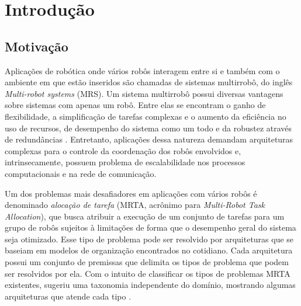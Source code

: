 \chapter[Introdução]{Introdução} \label{cap:introducao}

    \section{Motivação} \label{sec:motivacao}
        Aplicações de robótica onde vários robôs interagem entre si e também com o ambiente em que estão inseridos são chamadas de sistemas multirrobô, do inglês \textit{Multi-robot systems} (MRS). Um sistema multirrobô possui diversas vantagens sobre sistemas com apenas um robô. Entre elas se encontram o ganho de flexibilidade, a simplificação de tarefas complexas e o aumento da eficiência no uso de recursos, de desempenho do sistema como um todo e da robustez através de redundâncias \cite{ref:cao1997cooperative, ref:dudek1996taxonomy, ref:zlot2002multi}. Entretanto, aplicações dessa natureza demandam arquiteturas complexas para o controle da coordenação dos robôs envolvidos e, intrinsecamente, possuem problema de escalabilidade nos processos computacionais e na rede de comunicação. 
        
        Um dos problemas mais desafiadores em aplicações com vários robôs é denominado \textit{alocação de tarefa} (MRTA, acrônimo para \textit{Multi-Robot Task Allocation}), que busca atribuir a execução de um conjunto de tarefas para um grupo de robôs sujeitos à limitações de forma que o desempenho geral do sistema seja otimizado. Esse tipo de problema pode ser resolvido por arquiteturas que se baseiam em modelos de organização encontrados no cotidiano. Cada arquitetura possui um conjunto de premissas que delimita os tipos de problema que podem ser resolvidos por ela. Com o intuito de classificar os tipos de problemas MRTA existentes,  sugeriu uma taxonomia independente do domínio, mostrando algumas arquiteturas que atende cada tipo \cite{ref:parker1998alliance, ref:gerkey2002murdoch, ref:botelho1999m+, ref:werger2000ble, ref:frank2005kuhn, ref:stentz1999fpo, ref:chaimowicz2002dra}. 
        

